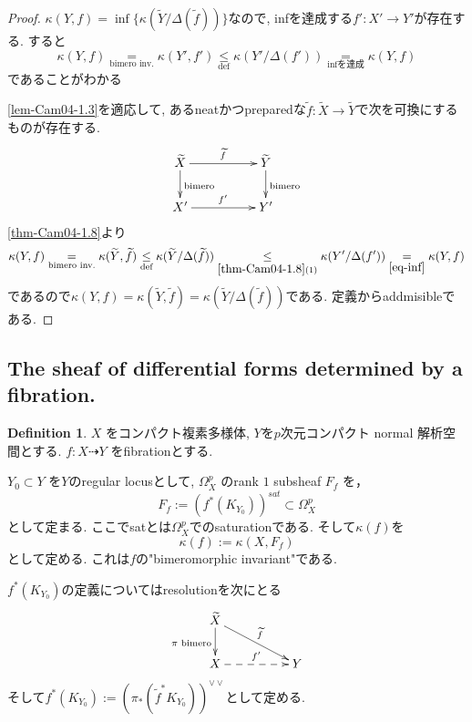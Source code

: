 \documentclass[dvipdfmx,a4paper,11pt]{article} %
\theoremstyle{definition}
\newtheorem{defn}[thm]{Definition}
\theoremstyle{remark}
\numberwithin{equation}{section}
\begin{document}
\begin{proof}
$\kappa(Y, f)=\inf\{\kappa(\widetilde{Y}/\Delta(\widetilde{f}))\}$なので, infを達成する$f' : X' \to Y'$が存在する. 
すると
\begin{equation}
\label{eq-inf}
\kappa(Y, f)\underset{\text{bimero inv.}}{=}\kappa(Y', f') \underset{\text{def}}{\le} \kappa(Y' / \Delta(f'))\underset{\text{infを達成}}{=}\kappa(Y, f)
\end{equation}
であることがわかる

\ref{lem-Cam04-1.3}を適応して, あるneatかつpreparedな$\widetilde{f}: \widetilde{X} \to \widetilde{Y}$で次を可換にするものが存在する. 
  \[
\xymatrix@C=50pt@R=20pt{
\widetilde{X} \ar@{->}[d]^{\text{bimero}}\ar@{->}[r]^{\widetilde{f}} &\widetilde{Y} \ar@{->}[d]^{\text{bimero}}\\
 X'\ar@{->}[r]^{f'} & Y'\\
}
\]
\ref{thm-Cam04-1.8}より
$$
\kappa(Y, f)\underset{\text{bimero inv.}}{=}
\kappa(\widetilde{Y}, \widetilde{f})
\underset{\text{def}}{\le} 
\kappa(\widetilde{Y}/\Delta(\widetilde{f})) 
\underset{\ref{thm-Cam04-1.8} (1)}{\le} 
\kappa(Y'/ \Delta(f')) \underset{\ref{eq-inf}}{=}
\kappa(Y, f)
$$
であるので$\kappa(Y, f) = \kappa(\widetilde{Y}, \widetilde{f}) = \kappa(\widetilde{Y}/\Delta(\widetilde{f}))$である. 定義からaddmisibleである. 
\end{proof}



\subsection{The sheaf of differential forms determined by a fibration. \cite[1.4]{Cam04}}


\begin{defn}\cite[Definition 1.19]{Cam04}
\label{defn-Cam04-1.19}
\(X\) をコンパクト複素多様体, $Y$を$p$次元コンパクト normal 解析空間とする. 
\(f : X \dashrightarrow Y\) をfibrationとする. 

\(Y_0 \subset Y\) を$Y$のregular locusとして, 
\(\Omega_X^p\) のrank \(1\) subsheaf
\(F_f\) を，
$$
F_f := (f^*(K_{Y_0}))^{sat} \subset \Omega_X^p
$$
として定まる. ここでsatとは$\Omega_{X}^{p}$でのsaturationである.
そして$\kappa(f)$を
$$
\kappa(f) := \kappa(X, F_f)
$$
として定める. これは$f$の"bimeromorphic invariant"である. 
\end{defn}
$f^*(K_{Y_0})$の定義についてはresolutionを次にとる
  \[
\xymatrix@C=50pt@R=20pt{
\widetilde{X} \ar@{->}[d]_{\pi \text{ bimero}}\ar@{->}[rd]^{\widetilde{f}} &\\
 X\ar@{-->}[r]^{f'} & Y\\
}
\]
そして$f^*(K_{Y_0}):= (\pi_{*}(\widetilde{f}^{*}K_{Y_0}) )^{\vee\vee}$として定める. 
\end{document}
